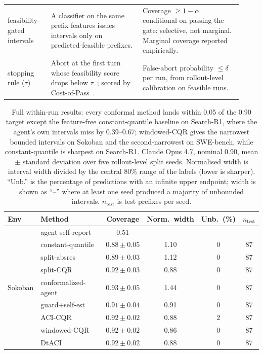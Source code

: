 \documentclass{article}
\begin{document}
\begin{table}[t]
\begin{tabular}{@{}p{0.17\linewidth}p{0.36\linewidth}p{0.39\linewidth}@{}}
feasibility-gated intervals & A classifier on the same prefix features issues intervals only on predicted-feasible prefixes. & Coverage $\ge 1{-}\alpha$ conditional on passing the gate: selective, not marginal. Marginal coverage reported empirically. \\
stopping rule ($\tau$) & Abort at the first turn whose feasibility score drops below $\tau$~\cite{angelopoulos2024crc}; scored by Cost-of-Pass~\cite{erol2026costofpass}. & False-abort probability $\le\delta$ per run, from rollout-level calibration on feasible runs. \\
\bottomrule
\end{tabular}
\end{table}

\begin{table}[t]
\centering
\caption{Full within-run results: every conformal method lands within 0.05 of the 0.90 target except the feature-free constant-quantile baseline on Search-R1, where the agent's own intervals miss by 0.39--0.67; windowed-CQR gives the narrowest bounded intervals on Sokoban and the second-narrowest on SWE-bench, while constant-quantile is sharpest on Search-R1. Claude Opus 4.7, nominal 0.90, mean$\pm$ standard deviation over five rollout-level split seeds. Normalised width is interval width divided by the central 80\% range of the labels (lower is sharper). ``Unb.'' is the percentage of predictions with an infinite upper endpoint; width is shown as ``--'' where at least one seed produced a majority of unbounded intervals. $n_{\mathrm{test}}$ is test prefixes per seed.}
\label{tab:coverage}
\small
\begin{tabular}{@{}llcccc@{}}
\toprule
Env & Method & Coverage & Norm.\ width & Unb.\ (\%) & $n_{\mathrm{test}}$ \\
\midrule
\multirow{9}{*}{Sokoban}
 & agent self-report & 0.51 & -- & -- & -- \\
 & constant-quantile & $0.88\pm0.05$ & 1.10 & 0 & 87 \\
 & split-absres & $0.89\pm0.03$ & 1.12 & 0 & 87 \\
 & split-CQR & $0.92\pm0.03$ & 0.88 & 0 & 87 \\
 & conformalized-agent & $0.93\pm0.05$ & 1.44 & 0 & 87 \\
 & guard+self-est & $0.91\pm0.04$ & 0.91 & 0 & 87 \\
 & ACI-CQR & $0.92\pm0.02$ & 0.88 & 2 & 87 \\
 & windowed-CQR & $0.92\pm0.02$ & 0.86 & 0 & 87 \\
 & DtACI & $0.92\pm0.02$ & 0.88 & 0 & 87 \\

\end{tabular}
\end{table}
\end{document}
